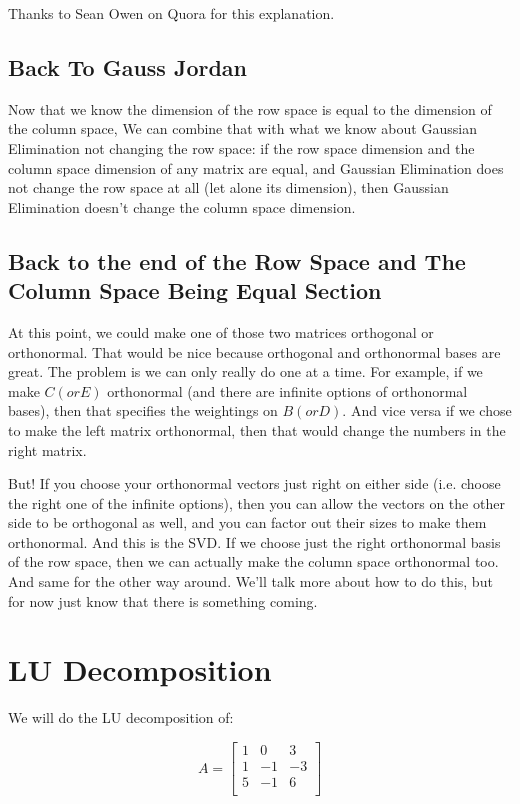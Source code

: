 \documentclass{article}
\begin{document}
Thanks to Sean Owen on Quora for this explanation.

\subsection{Back To Gauss Jordan}

Now that we know the dimension of the row space is equal to the dimension of the column space, We can combine that with what we know about Gaussian Elimination not changing the row space: if the row space dimension and the column space dimension of any matrix are equal, and Gaussian Elimination does not change the row space at all (let alone its dimension), then Gaussian Elimination doesn't change the column space dimension.

\subsection{Back to the end of the Row Space and The Column Space Being Equal Section}

At this point, we could make one of those two matrices orthogonal or orthonormal. That would be nice because orthogonal and orthonormal bases are great. The problem is we can only really do one at a time. For example, if we make $C (or E)$ orthonormal (and there are infinite options of orthonormal bases), then that specifies the weightings on $B (or D)$.  And vice versa if we chose to make the left matrix orthonormal, then that would change the numbers in the right matrix. 

But! If you choose your orthonormal vectors just right on either side (i.e. choose the right one of the infinite options), then you can allow the vectors on the other side to be orthogonal as well, and you can factor out their sizes to make them orthonormal. And this is the SVD.  If we choose just the right orthonormal basis of the row space, then we can actually make the column space orthonormal too.  And same for the other way around. We'll talk more about how to do this, but for now just know that there is something coming.
\newpage
\section{LU Decomposition}

We will do the LU decomposition of:

$$A = \begin{bmatrix}
  1  & 0 & 3 \\
   1 & -1 & -3 \\
  5  & -1 & 6 \\
   \end{bmatrix}
$$
\end{document}
